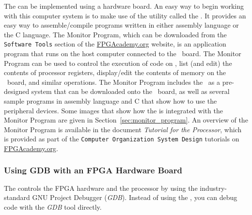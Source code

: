 The {\it \systemNameFull} can be implemented using a {\DEBoard} hardware
board.  An easy way to begin working with this computer system 
is to make use of the utility called the {\it \productNameMed{}}.  It
provides an easy way to assemble/compile {\processor} programs 
written in either assembly language or the C language. The Monitor 
Program, which can be downloaded from the \texttt{Software Tools} section of the
\href{https://www.fpgacademy.org/tools.html} {FPGAcademy.org} website,
is an application program that 
runs on the host computer connected to the \DEBoard~board.  The Monitor Program can be 
used to control
the execution of code on {\processor}, list (and edit) the contents of processor registers, 
display/edit the contents of memory on the \DEBoard~board, and similar operations.
The Monitor Program includes the \systemName~as a pre-designed system that can be
downloaded onto the \DEBoard~board, as well as several sample programs in assembly language and
C that show how to use the {\it \systemNameFull} peripheral devices.
Some images that show how the {\it \systemNameFull} is integrated with the 
Monitor Program are given in Section~\ref{sec:monitor_program}.
An overview of the Monitor Program is available in the document
{\it \productNameMed{} Tutorial for the {\processor} Processor}, which is provided 
as part of the \texttt{Computer Organization System Design} tutorials on
\href{https://www.fpgacademy.org/tutorials.html} {FPGAcademy.org}.

\subsubsection {Using GDB with an FPGA Hardware Board}
The {\it \productNameMed{}} controls the FPGA hardware and the {\processor}
processor by using the industry-standard GNU Project Debugger ({\it GDB}). Instead of using
the {\it \productNameMed{}}, you can debug code with the {\it GDB} tool directly.
